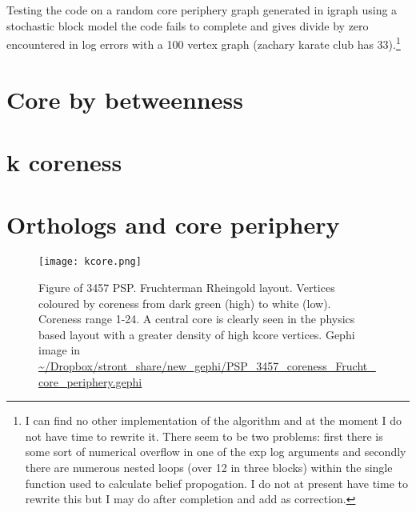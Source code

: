 Testing the code on a random core periphery graph generated in igraph using a stochastic block model the code fails to complete and gives divide by zero encountered in log errors with a 100 vertex graph (zachary karate club has 33).\footnote{I can find no other implementation of the algorithm and at the moment I do not have time to rewrite it. There seem to be two problems: first there is some sort of numerical overflow in one of the exp log arguments and secondly there are numerous nested loops (over 12 in three blocks) within the single function used to calculate belief propogation. I do not at present have time to rewrite this but I may do after completion and add as correction.}


\section{Core by betweenness}

\section{k coreness}

\section{Orthologs and core periphery}



\begin{figure}[h]
\texttt{[image: kcore.png]}
\caption{Figure of 3457 PSP. Fruchterman Rheingold layout. Vertices coloured by coreness from dark green (high) to white (low). Coreness range 1-24. A central core is clearly seen in the physics based layout with a greater density of high kcore vertices. Gephi image in \url{~/Dropbox/stront_share/new_gephi/PSP_3457_coreness_Frucht_core_periphery.gephi}}
\label{Fig:kcoreness}
\end{figure}



